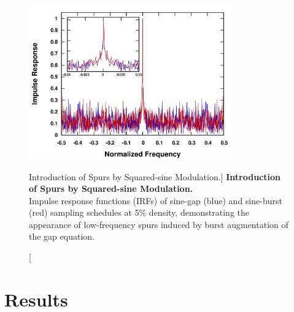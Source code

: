 \begin{figure}
\includegraphics[width=3.5in]{figs/dgs/09-spurs.png}
\caption
      [Introduction of Spurs by Squared-sine Modulation.]{
  {\bf Introduction of Spurs by Squared-sine Modulation.}
  \\
  Impulse response functions (IRFs) of sine-gap (blue) and sine-burst (red)
  sampling schedules at 5\% density, demonstrating the appearance of
  low-frequency spurs induced by burst augmentation of the gap equation.
}
\label{figure.2.9}
\end{figure}

\section{Results}

